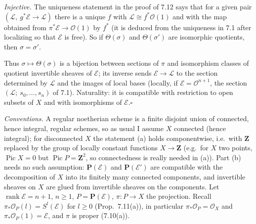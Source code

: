 \documentclass[11pt]{article}
\begin{document}
\emph{Injective.} The uniqueness statement in the proof of 7.12 says that for a given pair $(\mathcal L,\ g^*\mathcal E\to\mathcal L)$ there is a unique $f$ with $\mathcal L\cong f^*\mathcal O(1)$ and with the map obtained from $\pi^*\mathcal E\to\mathcal O(1)$ by $f^*$ (it is deduced from the uniqueness in 7.1 after localizing so that $\mathcal E$ is free). So if $\Theta(\sigma)$ and $\Theta(\sigma')$ are isomorphic quotients, then $\sigma=\sigma'$.

Thus $\sigma\mapsto\Theta(\sigma)$ is a bijection between sections of $\pi$ and isomorphism classes of quotient invertible sheaves of $\mathcal E$; its inverse sends $\mathcal E\to\mathcal L$ to the section determined by $\mathcal L$ and the images of local bases (locally, if $\mathcal E=\mathcal O^{n+1}$, the section $(\mathcal L;\ s_0,\dots,s_n)$ of 7.1). Naturality: it is compatible with restriction to open subsets of $X$ and with isomorphisms of $\mathcal E$.\hfill$\square$

\pf
\emph{Conventions.} A regular noetherian scheme is a finite disjoint union of connected, hence integral, regular schemes, so as usual I assume $X$ connected (hence integral); for disconnected $X$ the statement (a) holds componentwise, i.e.\ with $\mathbf Z$ replaced by the group of locally constant functions $X\to\mathbf Z$ (e.g.\ for $X$ two points, $\operatorname{Pic}X=0$ but $\operatorname{Pic}P=\mathbf Z^2$, so connectedness is really needed in (a)). Part (b) needs no such assumption: $\mathbf P(\mathcal E)$ and $\mathbf P(\mathcal E')$ are compatible with the decomposition of $X$ into its finitely many connected components, and invertible sheaves on $X$ are glued from invertible sheaves on the components. Let $\operatorname{rank}\mathcal E=n+1$, $n\ge1$, $P=\mathbf P(\mathcal E)$, $\pi:P\to X$ the projection. Recall $\pi_*\mathcal O_P(l)=S^l(\mathcal E)$ for $l\ge0$ (Prop.~7.11(a)), in particular $\pi_*\mathcal O_P=\mathcal O_X$ and $\pi_*\mathcal O_P(1)=\mathcal E$, and $\pi$ is proper (7.10(a)).
\end{document}
